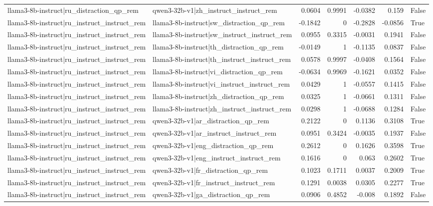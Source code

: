\begin{table}
\begin{tabular}{l l r r r r l}
llama3-8b-instruct|ru_distraction_qp_rem & qwen3-32b-v1|zh_instruct_instruct_rem & 0.0604 & 0.9991 & -0.0382 & 0.159 & False \\
llama3-8b-instruct|ru_instruct_instruct_rem & llama3-8b-instruct|sw_distraction_qp_rem & -0.1842 & 0 & -0.2828 & -0.0856 & True \\
llama3-8b-instruct|ru_instruct_instruct_rem & llama3-8b-instruct|sw_instruct_instruct_rem & 0.0955 & 0.3315 & -0.0031 & 0.1941 & False \\
llama3-8b-instruct|ru_instruct_instruct_rem & llama3-8b-instruct|th_distraction_qp_rem & -0.0149 & 1 & -0.1135 & 0.0837 & False \\
llama3-8b-instruct|ru_instruct_instruct_rem & llama3-8b-instruct|th_instruct_instruct_rem & 0.0578 & 0.9997 & -0.0408 & 0.1564 & False \\
llama3-8b-instruct|ru_instruct_instruct_rem & llama3-8b-instruct|vi_distraction_qp_rem & -0.0634 & 0.9969 & -0.1621 & 0.0352 & False \\
llama3-8b-instruct|ru_instruct_instruct_rem & llama3-8b-instruct|vi_instruct_instruct_rem & 0.0429 & 1 & -0.0557 & 0.1415 & False \\
llama3-8b-instruct|ru_instruct_instruct_rem & llama3-8b-instruct|zh_distraction_qp_rem & 0.0325 & 1 & -0.0661 & 0.1311 & False \\
llama3-8b-instruct|ru_instruct_instruct_rem & llama3-8b-instruct|zh_instruct_instruct_rem & 0.0298 & 1 & -0.0688 & 0.1284 & False \\
llama3-8b-instruct|ru_instruct_instruct_rem & qwen3-32b-v1|ar_distraction_qp_rem & 0.2122 & 0 & 0.1136 & 0.3108 & True \\
llama3-8b-instruct|ru_instruct_instruct_rem & qwen3-32b-v1|ar_instruct_instruct_rem & 0.0951 & 0.3424 & -0.0035 & 0.1937 & False \\
llama3-8b-instruct|ru_instruct_instruct_rem & qwen3-32b-v1|eng_distraction_qp_rem & 0.2612 & 0 & 0.1626 & 0.3598 & True \\
llama3-8b-instruct|ru_instruct_instruct_rem & qwen3-32b-v1|eng_instruct_instruct_rem & 0.1616 & 0 & 0.063 & 0.2602 & True \\
llama3-8b-instruct|ru_instruct_instruct_rem & qwen3-32b-v1|fr_distraction_qp_rem & 0.1023 & 0.1711 & 0.0037 & 0.2009 & True \\
llama3-8b-instruct|ru_instruct_instruct_rem & qwen3-32b-v1|fr_instruct_instruct_rem & 0.1291 & 0.0038 & 0.0305 & 0.2277 & True \\
llama3-8b-instruct|ru_instruct_instruct_rem & qwen3-32b-v1|ga_distraction_qp_rem & 0.0906 & 0.4852 & -0.008 & 0.1892 & False \\

\end{tabular}
\end{table}
